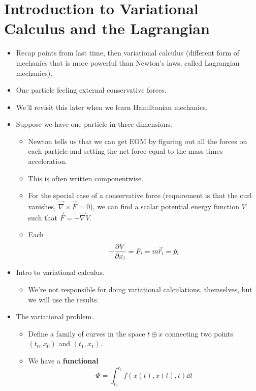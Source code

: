 \documentclass[../notes.tex]{subfiles}
\begin{document}
\section{Introduction to Variational Calculus and the Lagrangian}
\begin{itemize}
    \item {}Recap points from last time, then variational calculus (different form of mechanics that is more powerful than Newton's laws, called Lagrangian mechanics).
    \item One particle feeling external conservative forces.
    \item We'll revisit this later when we learn Hamiltonian mechanics.
    \item Suppose we have one particle in three dimensions.
    \begin{itemize}
        \item Newton tells us that we can get EOM by figuring out all the forces on each particle and setting the net force equal to the mass times acceleration.
        \item This is often written componentwise.
        \item For the special case of a conservative force (requirement is that the curl vanishes, $\vec{\nabla}\times\vec{F}=0$), we can find a scalar potential energy function $V$ such that $\vec{F}=-\vec{\nabla}V$.
        \item Each
        \begin{equation*}
            -\pdv{V}{x_i} = F_i = m\vec{\ddot{r}}_i = \dot{p}_i
        \end{equation*}
    \end{itemize}
    \item Intro to variational calculus.
    \begin{itemize}
        \item We're not responsible for doing variational calculations, themselves, but we will use the results.
    \end{itemize}
    \item The variational problem.
    \begin{itemize}
        \item Define a family of curves in the space $t\oplus x$ connecting two points $(t_0,x_0)$ and $(t_1,x_1)$.
        \item We have a \textbf{functional}
        \begin{equation*}
            \Phi = \int_{t_0}^{t_1}f(x(t),\dot{x}(t),t)\dd{t}
        \end{equation*}

\end{itemize}
\end{itemize}
\end{document}
